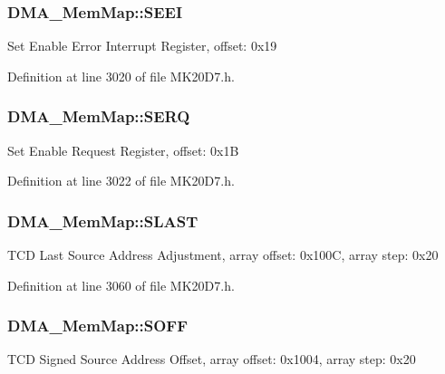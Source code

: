 \subsubsection[{\texorpdfstring{S\+E\+EI}{SEEI}}]{ D\+M\+A\+\_\+\+Mem\+Map\+::\+S\+E\+EI}\hypertarget{struct_d_m_a___mem_map_a576075e4d10859c84e48e7abc1e030aa}{}\label{struct_d_m_a___mem_map_a576075e4d10859c84e48e7abc1e030aa}
Set Enable Error Interrupt Register, offset\+: 0x19 

Definition at line 3020 of file M\+K20\+D7.\+h.

\subsubsection[{\texorpdfstring{S\+E\+RQ}{SERQ}}]{ D\+M\+A\+\_\+\+Mem\+Map\+::\+S\+E\+RQ}\hypertarget{struct_d_m_a___mem_map_ac6934aad6952b966b2d0bed0e5d4d58c}{}\label{struct_d_m_a___mem_map_ac6934aad6952b966b2d0bed0e5d4d58c}
Set Enable Request Register, offset\+: 0x1B 

Definition at line 3022 of file M\+K20\+D7.\+h.

\subsubsection[{\texorpdfstring{S\+L\+A\+ST}{SLAST}}]{ D\+M\+A\+\_\+\+Mem\+Map\+::\+S\+L\+A\+ST}\hypertarget{struct_d_m_a___mem_map_a2642aa56631c9a8c9b83ca244f8ce0dd}{}\label{struct_d_m_a___mem_map_a2642aa56631c9a8c9b83ca244f8ce0dd}
T\+CD Last Source Address Adjustment, array offset\+: 0x100C, array step\+: 0x20 

Definition at line 3060 of file M\+K20\+D7.\+h.

\subsubsection[{\texorpdfstring{S\+O\+FF}{SOFF}}]{ D\+M\+A\+\_\+\+Mem\+Map\+::\+S\+O\+FF}\hypertarget{struct_d_m_a___mem_map_abbbb3ec6364c286b7db38b8eefb64250}{}\label{struct_d_m_a___mem_map_abbbb3ec6364c286b7db38b8eefb64250}
T\+CD Signed Source Address Offset, array offset\+: 0x1004, array step\+: 0x20 

